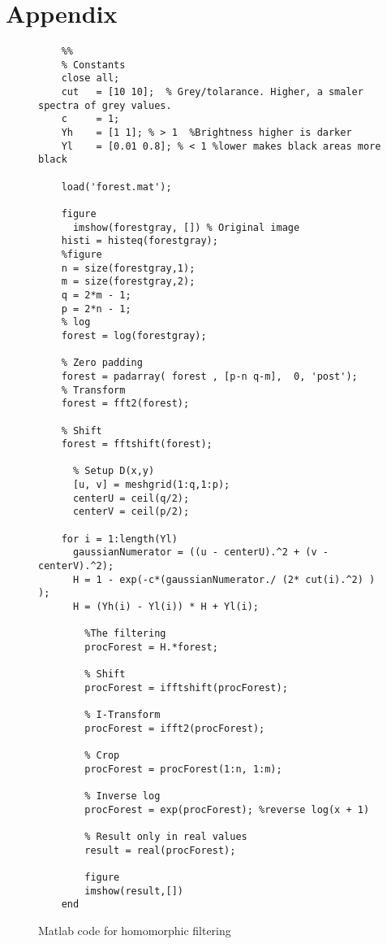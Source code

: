 \section{Appendix}
\begin{figure}[h!]
  \begin{lstlisting}
    %%
    % Constants
    close all;
    cut   = [10 10];  % Grey/tolarance. Higher, a smaler spectra of grey values.
    c     = 1;
    Yh    = [1 1]; % > 1  %Brightness higher is darker
    Yl    = [0.01 0.8]; % < 1 %lower makes black areas more black

    load('forest.mat');

    figure
      imshow(forestgray, []) % Original image
    histi = histeq(forestgray);
    %figure
    n = size(forestgray,1);
    m = size(forestgray,2);
    q = 2*m - 1;
    p = 2*n - 1;
    % log
    forest = log(forestgray);

    % Zero padding
    forest = padarray( forest , [p-n q-m],  0, 'post');   
    % Transform
    forest = fft2(forest);                                

    % Shift
    forest = fftshift(forest);                            
      
      % Setup D(x,y)
      [u, v] = meshgrid(1:q,1:p);
      centerU = ceil(q/2);
      centerV = ceil(p/2);

    for i = 1:length(Yl)
      gaussianNumerator = ((u - centerU).^2 + (v - centerV).^2);
      H = 1 - exp(-c*(gaussianNumerator./ (2* cut(i).^2) ) );
      H = (Yh(i) - Yl(i)) * H + Yl(i);
      
        %The filtering
        procForest = H.*forest;

        % Shift
        procForest = ifftshift(procForest);

        % I-Transform
        procForest = ifft2(procForest);

        % Crop
        procForest = procForest(1:n, 1:m);

        % Inverse log
        procForest = exp(procForest); %reverse log(x + 1)

        % Result only in real values
        result = real(procForest);

        figure
        imshow(result,[])
    end
  \end{lstlisting}
  \label{code:main}
  \caption{Matlab code for homomorphic filtering}
\end{figure}